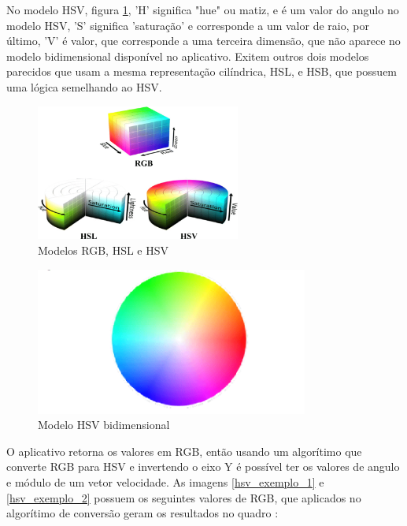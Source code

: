 No modelo HSV,  figura  \ref{rbg_hsl_hsv}, 'H' significa "hue" ou matiz, e é um valor do angulo no modelo HSV, 'S' significa 'saturação' e corresponde a um valor de raio,
por último, 'V' é valor, que corresponde a uma terceira dimensão, que não aparece no modelo bidimensional disponível no aplicativo.
Exitem outros dois modelos parecidos que usam a mesma representação cilíndrica, HSL, e HSB, que possuem uma lógica semelhando ao HSV.


\begin{figure}[htb]
	\centering
	\includegraphics[width=0.6\textwidth]{figures/RBG_HSL_HSV}
	\caption{Modelos RGB, HSL e HSV \cite{rbg_hsl_hsv}}
	\label{rbg_hsl_hsv}
\end{figure}

\begin{figure}[htb]
	\centering
	\includegraphics[width=0.8\textwidth]{figures/HSV}
	\caption{Modelo HSV bidimensional \cite{hsv_model}}
\end{figure}


O aplicativo retorna os valores em RGB, então usando um algorítimo que converte RGB para HSV e invertendo o eixo Y
é possível ter os valores de angulo e módulo de um vetor velocidade.
As imagens \ref{hsv_exemplo_1} e \ref{hsv_exemplo_2} possuem os seguintes valores de RGB, que aplicados no algorítimo de conversão geram os resultados no quadro :

